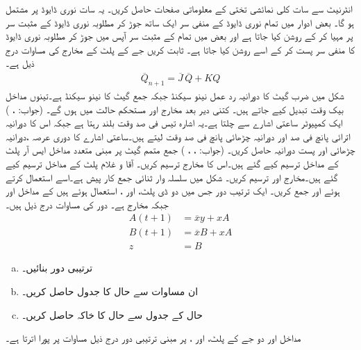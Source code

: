  انٹرنیٹ سے سات کلی  نمائشی تختی کے معلوماتی صفحات حاصل کریں۔ یہ سات نوری ڈایوڈ  پر  مشتمل ہو گا۔ بعض ادوار میں تمام نوری ڈایوڈ کے منفی سر ایک ساتھ جوڑ  کر  مطلوبہ نوری ڈایوڈ کے مثبت سر پر  مہیا   کر کے روشن کیا جاتا ہے اور بعض میں تمام کے مثبت سر آپس میں جوڑ کر مطلوبہ نوری ڈایوڈ کا  منفی سر پست کر کے اسے روشن کیا جاتا ہے۔
 ثابت کریں  جے کے پلٹ کے مخارج   کی مساوات    درج ذیل ہے۔
 \begin{align*}
 \overline{Q}_{n+1}=\overline{J}\,\overline{Q}+KQ
 \end{align*}
 شکل میں ضرب گیٹ کا دورانیہ رد عمل   نینو سیکنڈ جبکہ جمع گیٹ کا  نینو سیکنڈ ہے۔تینوں مداخل بیک وقت تبدیل کیے جاتے ہیں۔ کتنی دیر بعد مخارج  اور   مستحکم حالت میں ہوں گے۔ (جواب:  ، )
 ایک کمپیوٹر    ساعتی اشارے  سے چلتا ہے۔یہ  اشارہ تیس فی صد وقت بلند رہتا ہے جبکہ اس کا دورانیہ اترائی  پانچ فی صد اور دورانیہ چڑھائی پانچ فی صد وقت لیتے ہیں۔ساعتی اشارے  کا دوری عرصہ ،دورانیہ چڑھائی اور پست دورانیہ حاصل کریں۔ (جواب:  ،  ، )
 جمع متمم گیٹ پر مبنی متعدد  مداخل ایس آر پلٹ کے مداخل  ترسیم کیے گئے ہیں۔اس کا مخارج  ترسیم کریں۔
 آقا و غلام پلٹ کے مداخل  ترسیم  کیے گئے ہیں۔مخارج اور  ترسیم کریں۔
 شکل  میں سلسلہ وار ثنائی جمع کار  پیش ہے۔اسے استعمال کرتے ہوئے  اور    جمع کریں۔
ایک ترتیب دور جس میں دو ڈی پلٹ،   اور ،  استعمال ہوئے ہیں کے مداخل  اور   جبکہ مخارج  ہے۔ دور کی مساوات درج ذیل ہیں۔
\begin{align*}
A(t+1)&=\overline{x}y+xA\\
B(t+1)&=\overline{x}B+xA\\
z&=B
\end{align*}
\begin{enumerate}[a.]
\item
 ترتیبی دور  بنائیں۔ 
\item
  ان مساوات سے حال کا جدول حاصل کریں۔ 
\item
  حال  کے جدول سے حال کا خاکہ حاصل کریں۔
\end{enumerate}
 مداخل  اور دو جے کے پلٹ،   اور  ، پر مبنی ترتیبی دور درج ذیل مساوات   پر پورا اترتا ہے۔

